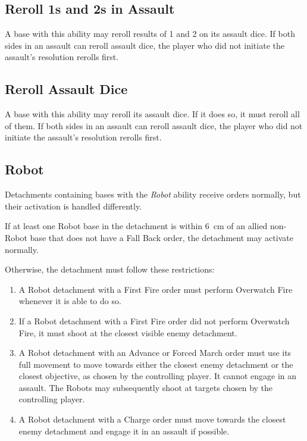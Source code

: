 \subsection{Reroll 1s and 2s in Assault}

A base with this ability may reroll results of 1 and 2 on its assault dice. If both sides in an assault can reroll assault dice, the player who did not initiate the assault's resolution rerolls first.

\subsection{Reroll Assault Dice}

A base with this ability may reroll its assault dice. If it does so, it must reroll all of them. If both sides in an assault can reroll assault dice, the player who did not initiate the assault's resolution rerolls first.

\subsection{Robot}

Detachments containing bases with the \textit{Robot} ability receive orders normally, but their activation is handled differently.

If at least one Robot base in the detachment is within 6~cm of an allied non-Robot base that does not have a Fall Back order, the detachment may activate normally.

Otherwise, the detachment must follow these restrictions:

\begin{enumerate}
    \item A Robot detachment with a First Fire order must perform Overwatch Fire whenever it is able to do so.

    \item If a Robot detachment with a First Fire order did not perform Overwatch Fire, it must shoot at the closest visible enemy detachment.

    \item A Robot detachment with an Advance or Forced March order must use its full movement to move towards either the closest enemy detachment or the closest objective, as chosen by the controlling player. It cannot engage in an assault. The Robots may subsequently shoot at targets chosen by the controlling player.

    \item A Robot detachment with a Charge order must move towards the closest enemy detachment and engage it in an assault if possible.
\end{enumerate}


